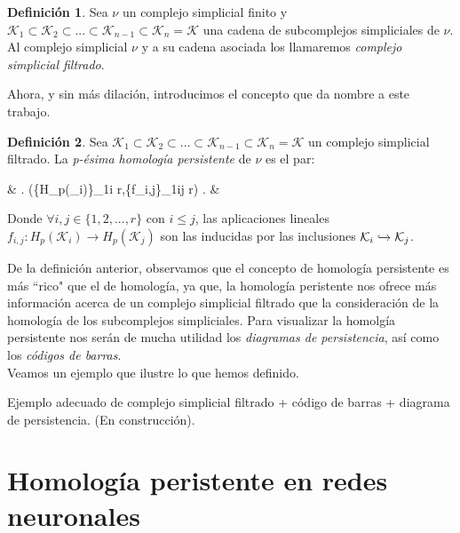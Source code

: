 \documentclass[12pt]{article}
\numberwithin{equation}{section}
\theoremstyle{definition}
\newtheorem{defi}{Definición}
\newenvironment{ejem}
  {\pushQED{\qed}\renewcommand{\qedsymbol}{$\blacktriangleleft$}\ejemplo}
  {\popQED\endejemplo}
\theoremstyle{remark}
\theoremstyle{plain}
\begin{document}
		\begin{defi}
		
			Sea {\Large $\nu$} un complejo simplicial finito y $\mathcal{K}_{1}\subset\mathcal{K}_{2}\subset...\subset\mathcal{K}_{n-1}\subset\mathcal{K}_{n}=\mathcal{K}$
			una cadena de subcomplejos simpliciales de {\Large $\nu$}. Al complejo simplicial {\Large $\nu$} y a su cadena asociada los llamaremos \textit{complejo simplicial filtrado}.

		\end{defi}

		Ahora, y sin más dilación, introducimos el concepto que da nombre a este trabajo.

		\begin{defi}
		
			Sea $\mathcal{K}_{1}\subset\mathcal{K}_{2}\subset...\subset\mathcal{K}_{n-1}\subset\mathcal{K}_{n}=\mathcal{K}$ un complejo simplicial filtrado. La 
			\textit{p-ésima homología persistente} de {\Large $\nu$} es el par:
			\begin{flalign*}
				& \left.	
				(\{H_{p}(_{i})\}_{1\leq i \leq r},\{f_{i,j}\}_{1\leq i\leq j \leq r})
				\right. &
			\end{flalign*}
			Donde $\forall i,j \in \{1,2,...,r\}$ con $i \leq j$, las aplicaciones lineales 
			$f_{i,j}:H_{p}(\mathcal{K}_{i})\rightarrow H_{p}(\mathcal{K}_{j})$ son las inducidas por las inclusiones $\mathcal{K}_{i}\xhookrightarrow{} \mathcal{K}_{j}$.
	

		\end{defi}
		
		

		De la definición anterior, observamos que el concepto de homología persistente es más ``rico" que el de homología, ya que, la homología peristente nos ofrece más
		información acerca de un complejo simplicial filtrado que la consideración de la homología de los subcomplejos simpliciales. Para visualizar la homolgía persistente
		nos serán de mucha utilidad los \textit{diagramas de persistencia}, así como los \textit{códigos de barras}.\\
		Veamos un ejemplo que ilustre lo que hemos definido.
		
		\begin{ejem}	
			Ejemplo adecuado de complejo simplicial filtrado + código de barras + diagrama de persistencia. (En construcción).
		\end{ejem}

	\section{Homología peristente en redes neuronales}
\end{document}
